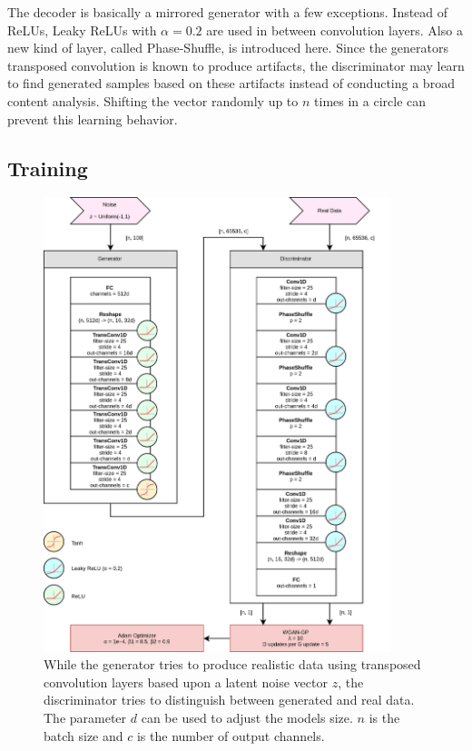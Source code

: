 \documentclass[12pt]{article}
\begin{document}
The decoder is basically a mirrored generator with a few exceptions.
Instead of ReLUs, Leaky ReLUs with $\alpha=0.2$ are used in between convolution layers.
Also a new kind of layer, called Phase-Shuffle, is introduced here. 
Since the generators transposed convolution is known to produce artifacts, the discriminator may learn to find generated samples based on these artifacts instead of conducting a broad content analysis.
Shifting the vector randomly up to $n$ times in a circle can prevent this learning behavior.





\subsection{Training}

\begin{figure}
\includegraphics[width=0.9\textwidth]{img/wavegan-arch.png}
\caption{While the generator tries to produce realistic data using transposed convolution layers based upon a latent noise vector $z$, the discriminator tries to distinguish between generated and real data. The parameter $d$ can be used to adjust the models size. $n$ is the batch size and $c$ is the number of output channels.}
\label{fig:WaveGan-arch}
\end{figure}
\end{document}
